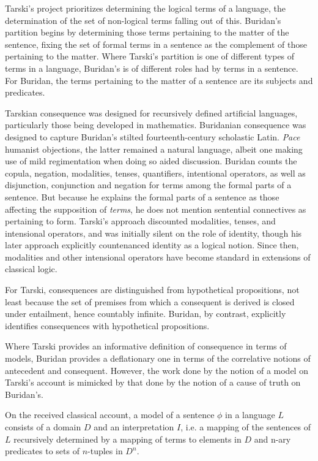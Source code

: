 \documentclass[]{article}
\begin{document}
Tarski's project prioritizes determining the logical terms of a language, the determination of the set of non-logical terms falling out of this. Buridan's partition begins by determining those terms pertaining to the matter of the sentence, fixing the set of formal terms in a sentence as the complement of those pertaining to the matter. Where Tarski's partition is one of different types of terms in a language, Buridan's is of different roles had by terms in a sentence. For Buridan, the terms pertaining to the matter of a sentence are its subjects and predicates.

Tarskian consequence was designed for recursively defined artificial languages, particularly those being developed in mathematics. Buridanian consequence was designed to capture Buridan's stilted fourteenth-century scholastic Latin. \textit{Pace} humanist objections, the latter remained a natural language, albeit one making use of mild regimentation when doing so aided discussion. Buridan counts the copula, negation, modalities, tenses, quantifiers, intentional operators, as well as disjunction, conjunction and negation for terms among the formal parts of a sentence. But because he explains the formal parts of a sentence as those affecting the supposition of \textit{terms}, he does not mention sentential connectives as pertaining to form. Tarski's approach discounted modalities, tenses, and intensional operators, and was initially silent on the role of identity, though his later approach explicitly countenanced identity as a logical notion. Since then, modalities and other intensional operators have become standard in extensions of classical logic.

For Tarski, consequences are distinguished from hypothetical propositions, not least because the set of premises from which a consequent is derived is closed under entailment, hence countably infinite. Buridan, by contrast, explicitly identifies consequences with hypothetical propositions.

Where Tarski provides an informative definition of consequence in terms of models, Buridan provides a deflationary one in terms of the correlative notions of antecedent and consequent. However, the work done by the notion of a model on Tarski's account is mimicked by that done by the notion of a cause of truth on Buridan's. 

On the received classical account, a model of a sentence $\phi$ in a language $L$ consists of a domain $D$ and an interpretation $I$, i.e. a mapping of the sentences of $L$ recursively determined by a mapping of terms to elements in $D$ and n-ary predicates to sets of $n$-tuples in $D^{n}$.
\end{document}
